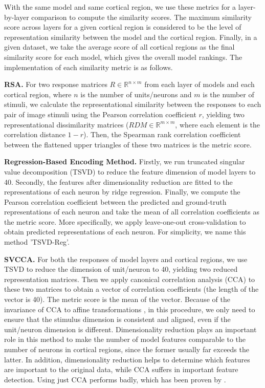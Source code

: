 \documentclass[letterpaper]{article} %
\begin{document}
With the same model and same cortical region, we use these metrics for a layer-by-layer comparison to compute the similarity scores. The maximum similarity score across layers for a given cortical region is considered to be the level of representation similarity between the model and the cortical region. Finally, in a given dataset, we take the average score of all cortical regions as the final similarity score for each model, which gives the overall model rankings. The implementation of each similarity metric is as follows.

\textbf{RSA.} For two response matrices $R \in \mathbb{R}^{n \times m}$ from each layer of models and each cortical region, where $n$ is the number of units/neurons and $m$ is the number of stimuli, we calculate the representational similarity between the responses to each pair of image stimuli using the Pearson correlation coefficient $r$, yielding two representational dissimilarity matrices ($RDM \in \mathbb{R}^{m \times m}$, where each element is the correlation distance $1 - r$). Then, the Spearman rank correlation coefficient between the flattened upper triangles of these two matrices is the metric score.

\textbf{Regression-Based Encoding Method.} Firstly, we run truncated singular value decomposition (TSVD) to reduce the feature dimension of model layers to 40. Secondly, the features after dimensionality reduction are fitted to the representations of each neuron by ridge regression. Finally, we compute the Pearson correlation coefficient between the predicted and ground-truth representations of each neuron and take the mean of all correlation coefficients as the metric score. More specifically, we apply leave-one-out cross-validation to obtain predicted representations of each neuron. For simplicity, we name this method 'TSVD-Reg'.

\textbf{SVCCA.} For both the responses of model layers and cortical regions, we use TSVD to reduce the dimension of unit/neuron to 40, yielding two reduced representation matrices. Then we apply canonical correlation analysis (CCA) to these two matrices to obtain a vector of correlation coefficients (the length of the vector is 40). The metric score is the mean of the vector. Because of the invariance of CCA to affine transformations \cite{raghu2017svcca}, in this procedure, we only need to ensure that the stimulus dimension is consistent and aligned, even if the unit/neuron dimension is different. Dimensionality reduction plays an important role in this method to make the number of model features comparable to the number of neurons in cortical regions, since the former usually far exceeds the latter. In addition, dimensionality reduction helps to determine which features are important to the original data, while CCA suffers in important feature detection. Using just CCA performs badly, which has been proven by \cite{raghu2017svcca}.
\end{document}
